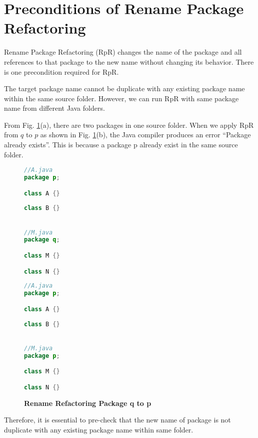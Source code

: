 \section{\textbf{Preconditions of Rename Package Refactoring}}
Rename Package Refactoring (RpR) changes the name of the package and all references to that package to the new name without changing its behavior. There is one precondition required for RpR.

The target package name cannot be duplicate with any existing package name within the same source folder. However, we can run RpR with same package name from different Java folders.

From Fig. \ref{fig:RpR}(a), there are two packages in one source folder. When we apply RpR from $q$ to $p$ as shown in Fig. \ref{fig:RpR}(b), the Java compiler produces an error ``Package already exists''. This is because a package p already exist in the same source folder. 

\begin{figure}[th]
\centering
\begin{minipage}[t]{0.45\linewidth}
\begin{lstlisting}[language=java, basicstyle=\scriptsize\ttfamily,frame=single]
//A.java
package p;

class A {}
	
class B {}


//M.java
package q;

class M {}	

class N {}
\end{lstlisting}
\end{minipage}
\hfill
\begin{minipage}[t]{0.45\linewidth}
\begin{lstlisting}[language=java, basicstyle=\scriptsize\ttfamily,frame=single]
//A.java
package p;

class A {}
	
class B {}


//M.java
package p;

class M {}	

class N {}


\end{lstlisting}
\end{minipage}
\caption{\textbf{Rename Refactoring Package q to p}}
\label{fig:RpR}
\end{figure}

Therefore, it is essential to pre-check that the new name of package is not duplicate with any existing package name within same folder.